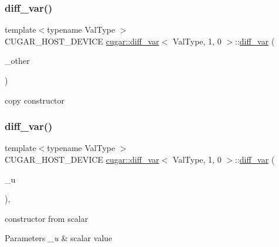 \subsubsection{\texorpdfstring{diff\+\_\+var()}{diff\_var()}\hspace{0.1cm}{\footnotesize\ttfamily [2/3]}}
{\footnotesize\ttfamily template$<$typename Val\+Type $>$ \\
C\+U\+G\+A\+R\+\_\+\+H\+O\+S\+T\+\_\+\+D\+E\+V\+I\+CE \hyperlink{structcugar_1_1diff__var}{cugar\+::diff\+\_\+var}$<$ Val\+Type, 1, 0 $>$\+::\hyperlink{structcugar_1_1diff__var}{diff\+\_\+var} (\begin{DoxyParamCaption}\item[{const \hyperlink{structcugar_1_1diff__var}{diff\+\_\+var}$<$ Val\+Type, 1, 0 $>$ \&}]{\+\_\+other }\end{DoxyParamCaption})\hspace{0.3cm}{\ttfamily [inline]}}

copy constructor \mbox{\label{structcugar_1_1diff__var_3_01_val_type_00_011_00_010_01_4_a634adb8e681a59a0c5c528045b19f3d8}} 
\subsubsection{\texorpdfstring{diff\+\_\+var()}{diff\_var()}\hspace{0.1cm}{\footnotesize\ttfamily [3/3]}}
{\footnotesize\ttfamily template$<$typename Val\+Type $>$ \\
C\+U\+G\+A\+R\+\_\+\+H\+O\+S\+T\+\_\+\+D\+E\+V\+I\+CE \hyperlink{structcugar_1_1diff__var}{cugar\+::diff\+\_\+var}$<$ Val\+Type, 1, 0 $>$\+::\hyperlink{structcugar_1_1diff__var}{diff\+\_\+var} (\begin{DoxyParamCaption}\item[{value\+\_\+type}]{\+\_\+u }\end{DoxyParamCaption})\hspace{0.3cm}{\ttfamily [inline]}, {\ttfamily [explicit]}}

constructor from scalar


\begin{DoxyParams}{Parameters}
{\em \+\_\+u} & scalar value \\
\hline
\end{DoxyParams}


